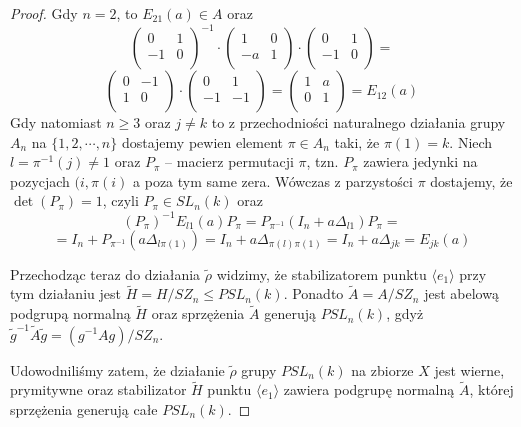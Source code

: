 \documentclass[licencjacka]{pracamgr}
\begin{document}
\begin{proof}
  Gdy $n = 2$, to $E_{2 1}(a) \in A$ oraz 
  $$ 
    \left( \begin{array}{cc} 0 & 1 \\ -1 & 0 \\ \end{array} \right)^{-1} \cdot
    \left( \begin{array}{cc} 1 & 0 \\ -a & 1 \\ \end{array} \right) \cdot
    \left( \begin{array}{cc} 0 & 1 \\ -1 & 0 \\ \end{array} \right) = 
  $$
  $$ 
    \left( \begin{array}{cc} 0 & -1 \\ 1 & 0 \\ \end{array} \right) \cdot
    \left( \begin{array}{cc} 0 & 1 \\ -1 & -1 \\ \end{array} \right) =
    \left( \begin{array}{cc} 1 & a \\ 0 & 1 \\ \end{array} \right) = E_{1 2}(a)
  $$
  Gdy natomiast $n \ge 3$ oraz $j \ne k$ to z przechodniości naturalnego działania grupy $A_n$ na $\{1, 2, \cdots, n \}$ 
  dostajemy pewien element $\pi \in A_n$ taki, że $\pi(1) = k$. Niech $l = \pi^{-1}(j) \ne 1$ oraz $P_\pi$ -- macierz permutacji $\pi$,
  tzn. $P_\pi$ zawiera jedynki na pozycjach $(i, \pi(i)$ a poza tym same zera.
  Wówczas z parzystości $\pi$ dostajemy, że $\det(P_\pi) = 1$, czyli $P_\pi \in SL_n(k)$ oraz
  $$ (P_\pi)^{-1} E_{l 1}(a) P_\pi = P_{\pi^{-1}} (I_n + a \Delta_{l 1}) P_\pi = $$
  $$ = I_n + P_{\pi^{-1}} (a \Delta_{l \pi(1)}) = I_n + a \Delta_{\pi(l) \pi(1)} = I_n + a \Delta_{j k} = E_{j k}(a) $$
  
  Przechodząc teraz do działania $\tilde{\rho}$ widzimy, że stabilizatorem punktu $\langle e_1 \rangle$ 
  przy tym działaniu jest $\tilde{H} = H/SZ_n \le PSL_n(k)$.
  Ponadto $\tilde{A} = A/SZ_n$ jest abelową podgrupą normalną $\tilde{H}$ oraz sprzężenia $\tilde{A}$ generują $PSL_n(k)$,
  gdyż $\tilde{g}^{-1} \tilde{A} \tilde{g} = (g^{-1} A g) / SZ_n$.

  Udowodniliśmy zatem, że działanie $\tilde{\rho}$ grupy $PSL_n(k)$ na zbiorze $X$ jest wierne, prymitywne 
  oraz stabilizator $\tilde{H}$ punktu $\langle e_1 \rangle$ zawiera podgrupę normalną $\tilde{A}$, 
  której sprzężenia generują całe $PSL_n(k)$.


\end{proof}
\end{document}
